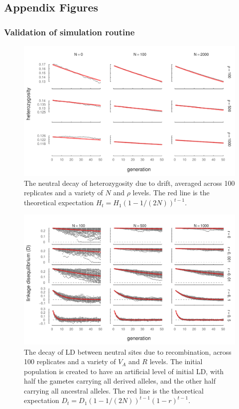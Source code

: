 \documentclass[11pt]{article}
\begin{document}
\newpage
\subsection{Appendix Figures}

\subsubsection{Validation of simulation routine}

\begin{figure}[!ht]
  \centering
  \includegraphics{./images/supp-het-neutral.pdf}

\caption{The neutral decay of heterozygosity due to drift, averaged across 100
replicates and a variety of $N$ and $\rho$ levels. The red line is the
theoretical expectation $H_t = H_1 (1-1/(2N))^{t-1}$.}

\label{fig:het-neut}
\end{figure}


\begin{figure}[!ht]
  \centering
  \includegraphics{./images/supp-ld-neutral.pdf}

  \caption{The decay of LD between neutral sites due to recombination, across
    100 replicates and a variety of $V_A$ and $R$ levels. The initial
    population is created to have an artificial level of initial LD, with half
    the gametes carrying all derived alleles, and the other half carrying all
  ancestral alleles. The red line is the theoretical expectation $D_t = D_1 (1-1/(2N))^{t-1} (1-r)^{t-1}$.}

  \label{fig:ld-neut}
\end{figure}
\end{document}
